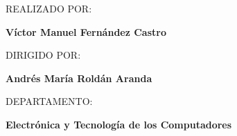 \begin{center}
REALIZADO POR:
\par\end{center}

\begin{center}
\textbf{Víctor Manuel Fernández Castro}
\par\end{center}

\begin{center}
DIRIGIDO POR:
\par\end{center}

\begin{center}
\textbf{Andrés María Roldán Aranda}
\par\end{center}

\begin{center}
DEPARTAMENTO:
\par\end{center}

\begin{center}
\textbf{Electrónica y Tecnología de los Computadores}
\par\end{center}

\begin{center}
\vfill 
\par\end{center}



\vspace*{1.5cm}

\newpage
\thispagestyle{empty}

~

